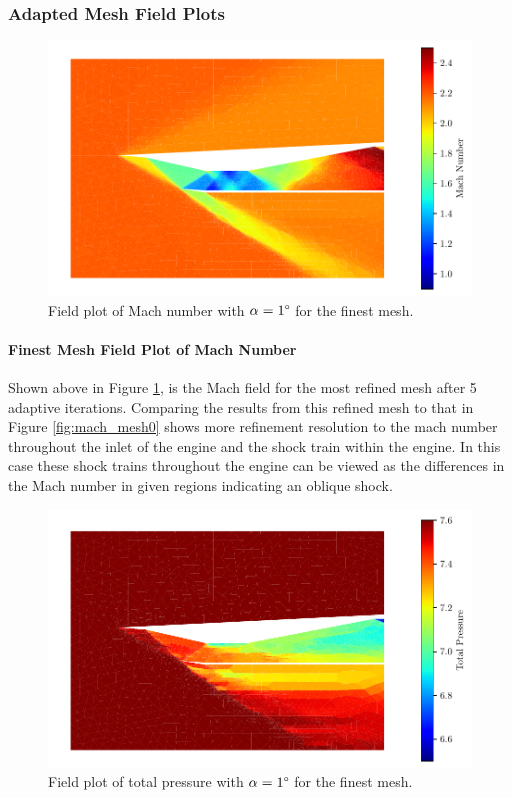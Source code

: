 \subsubsection{Adapted Mesh Field Plots}
\begin{figure}[h]
    \centering
    \includegraphics[width = 0.9\linewidth]{rep/q4/Machfield5.pdf}
    \caption[Field Plot of Mach Number for Adapted Mesh]{Field plot of Mach number with $\alpha = 1\degree$ for the finest mesh.}
    \label{fig:adapted_mach}
\end{figure}

\paragraph{Finest Mesh Field Plot of Mach Number} Shown above in Figure \ref{fig:adapted_mach}, is the Mach field for the most refined mesh after 5 adaptive iterations. Comparing the results from this refined mesh to that in Figure \ref{fig:mach_mesh0} shows more refinement resolution to the mach number throughout the inlet of the engine and the shock train within the engine. In this case these shock trains throughout the engine can be viewed as the differences in the Mach number in given regions indicating an oblique shock.

\pagebreak
\begin{figure}[h]
    \centering
    \includegraphics[width = 0.9\linewidth]{rep/q4/Pfield5.pdf}
    \caption[Field Plot of Total Pressure for Adapted Mesh]{Field plot of total pressure with $\alpha = 1\degree$ for the finest mesh.}
    \label{fig:adapted_pt}
\end{figure}


